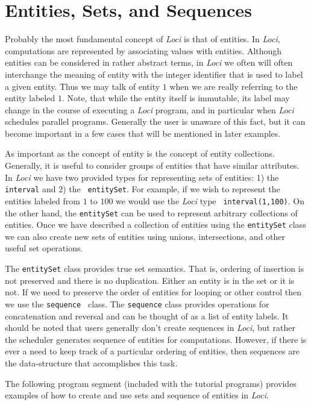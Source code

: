 \documentclass[10pt,epsf]{book}
\begin{document}
\section{Entities, Sets, and Sequences}

Probably the most fundamental concept of {\it Loci} is that of entities.  In
{\it Loci}, computations are represented by associating values with
entities.  Although entities can be considered in rather abstract
terms, in {\it Loci} we often will often interchange the meaning of entity
with the integer identifier that is used to label a given entity.
Thus we may talk of entity $1$ when we are really referring to the
entity labeled $1$.  Note, that while the entity itself is immutable,
its label may change in the course of executing a {\it Loci} program, and in
particular when {\it Loci} schedules parallel programs.  Generally the user
is unaware of this fact, but it can become important in a few cases
that will be mentioned in later examples.

As important as the concept of entity is the concept of entity
collections.  Generally, it is useful to consider groups of entities
that have similar attributes.  In {\it Loci} we have two provided types for
representing sets of entities: 1) the {\tt interval} and 2) the {\tt
  entitySet}.  For example, if we wish to represent the entities
labeled from $1$ to $100$ we would use the {\it Loci} type {\tt
  interval(1,100)}.  On the other hand, the {\tt entitySet} can be
used to represent arbitrary collections of entities.  Once we have
described a collection of entities using the {\tt entitySet} class we
can also create new sets of entities using unions, intersections, and
other useful set operations.

The {\tt entitySet} class provides true set semantics.
That is, ordering of insertion is not preserved and there is no
duplication.  Either an entity is in the set or it is not.  If we need
to preserve the order of entities for looping or other control then we
use the {\tt sequence } class.  The {\tt sequence} class provides
operations for concatenation and reversal and can be thought
of as a list of entity labels.  It should be noted that users
generally don't create sequences in {\it Loci}, but rather the scheduler
generates sequence of entities for computations.  However, if there is
ever a need to keep track of a particular ordering of entities, then
sequences are the data-structure that accomplishes this task.

The following program segment (included with the tutorial programs)
provides examples of how to create and use sets and sequence of
entities in {\it Loci}.
\end{document}
